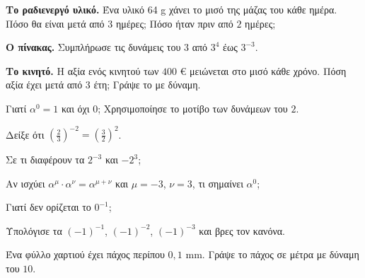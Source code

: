 \ex \textbf{Το ραδιενεργό υλικό.} Ένα υλικό 64 g χάνει το μισό της μάζας του κάθε ημέρα. Πόσο θα είναι μετά από $3$ ημέρες; Πόσο ήταν πριν από $2$ ημέρες;

\ex \textbf{Ο πίνακας.} Συμπλήρωσε τις δυνάμεις του $3$ από $3^4$ έως $3^{-3}$.

\ex \textbf{Το κινητό.} Η αξία ενός κινητού των $400$ € μειώνεται στο μισό κάθε χρόνο. Πόση αξία έχει μετά από $3$ έτη; Γράψε το με δύναμη.


\ex Γιατί $\alpha^0=1$ και όχι $0$; Χρησιμοποίησε το μοτίβο των δυνάμεων του $2$.

\ex Δείξε ότι $\left(\frac{2}{3}\right)^{-2}=\left(\frac{3}{2}\right)^2$.

\ex Σε τι διαφέρουν τα $2^{-3}$ και $-2^3$;

\ex Αν ισχύει $\alpha^\mu\cdot\alpha^\nu=\alpha^{\mu+\nu}$ και $\mu=-3$, $\nu=3$, τι σημαίνει $\alpha^0$;

\ex Γιατί δεν ορίζεται το $0^{-1}$;

\ex Υπολόγισε τα $(-1)^{-1}$, $(-1)^{-2}$, $(-1)^{-3}$ και βρες τον κανόνα.


\ex Ένα φύλλο χαρτιού έχει πάχος περίπου $0{,}1$ mm. Γράψε το πάχος σε μέτρα με δύναμη του $10$.
